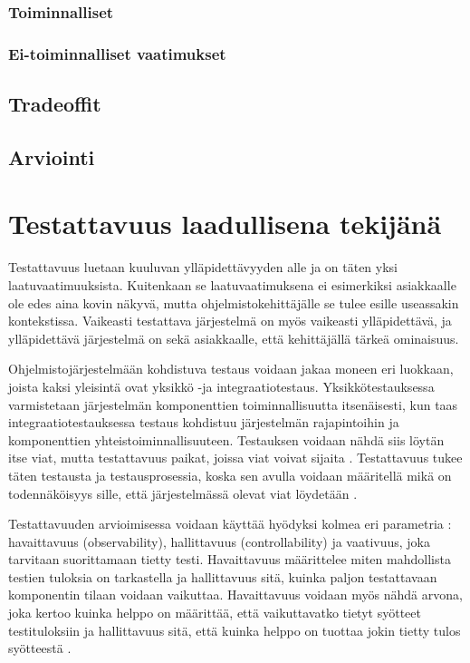 \documentclass[finnish]{tktltiki2}
\theoremstyle{definition}
\theoremstyle{remark}
\begin{document}
\subsubsection{Toiminnalliset}
\subsubsection{Ei-toiminnalliset vaatimukset}
\subsection{Tradeoffit}
\subsection{Arviointi}

\newpage

\section{Testattavuus laadullisena tekijänä}
Testattavuus luetaan kuuluvan ylläpidettävyyden alle \citep{ISO/IEC25010:2011} ja on täten yksi laatuvaatimuuksista. Kuitenkaan se laatuvaatimuksena ei esimerkiksi asiakkaalle ole edes aina kovin näkyvä, mutta ohjelmistokehittäjälle se tulee esille useassakin kontekstissa. Vaikeasti testattava järjestelmä on myös vaikeasti ylläpidettävä, ja ylläpidettävä järjestelmä on sekä asiakkaalle, että kehittäjällä tärkeä ominaisuus.

Ohjelmistojärjestelmään kohdistuva testaus voidaan jakaa moneen eri luokkaan, joista kaksi yleisintä ovat yksikkö -ja integraatiotestaus. Yksikkötestauksessa varmistetaan järjestelmän komponenttien toiminnallisuutta itsenäisesti, kun taas integraatiotestauksessa testaus kohdistuu järjestelmän rajapintoihin ja komponenttien yhteistoiminnallisuuteen. Testauksen voidaan nähdä siis löytän itse viat, mutta testattavuus paikat, joissa viat voivat sijaita \citep[s. 19]{Voas:1995:STN:624607.625469}. Testattavuus tukee täten testausta ja testausprosessia, koska sen avulla voidaan määritellä mikä on todennäköisyys sille, että järjestelmässä olevat viat löydetään \citep[s. 114]{voas_improving_1992}. 

Testattavuuden arvioimisessa voidaan käyttää hyödyksi kolmea eri parametria \citep[s. 2]{baudry_measuring_2003}: havaittavuus (observability), hallittavuus (controllability) ja vaativuus, joka tarvitaan suorittamaan tietty testi. Havaittavuus määrittelee miten mahdollista testien tuloksia on tarkastella ja hallittavuus sitä, kuinka paljon testattavaan komponentin tilaan voidaan vaikuttaa. Havaittavuus voidaan myös nähdä arvona, joka kertoo kuinka helppo on määrittää, että vaikuttavatko tietyt syötteet testituloksiin ja hallittavuus sitä, että kuinka helppo on tuottaa jokin tietty tulos syötteestä \citep[s. 554]{Freedman:1991:TSC:126218.126229}. 
\end{document}
